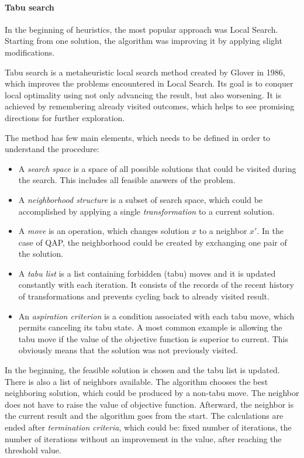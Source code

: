 \paragraph{Tabu search}

In the beginning of heuristics, the most popular approach was Local Search.
Starting from one solution, the algorithm was improving it by applying slight modifications.

Tabu search is a metaheuristic local search method created by Glover \cite{glover1986future} in 1986, which improves the problems encountered in Local Search.
Its goal is to conquer local optimality using not only advancing the result, but also worsening.
It is achieved by remembering already visited outcomes, which helps to see promising directions for further exploration.

The method has few main elements, which needs to be defined in order to understand the procedure:
\begin{itemize}
  \item A \textit{search space} is a space of all possible solutions that could be visited during the search. This includes all feasible answers of the problem.
  \item A \textit{neighborhood structure} is a subset of search space, which could be accomplished by applying a single \textit{transformation} to a current solution.
  \item A \textit{move} is an operation, which changes solution $x$ to a neighbor $x'$. In the case of QAP, the neighborhood could be created by exchanging one pair of the solution.
  \item A \textit{tabu list} is a list containing forbidden (tabu) moves and it is updated constantly with each iteration. It consists of the records of the recent history of transformations and prevents cycling back to already visited result.
  \item An \textit{aspiration criterion} is a condition associated with each tabu move, which permits canceling its tabu state. A most common example is allowing the tabu move if the value of the objective function is superior to current. This obviously means that the solution was not previously visited.
\end{itemize}

In the beginning, the feasible solution is chosen and the tabu list is updated.
There is also a list of neighbors available.
The algorithm chooses the best neighboring solution, which could be produced by a non-tabu move.
The neighbor does not have to raise the value of objective function.
Afterward, the neighbor is the current result and the algorithm goes from the start.
The calculations are ended after \textit{termination criteria}, which could be: fixed number of iterations, the number of iterations without an improvement in the value, after reaching the threshold value.


